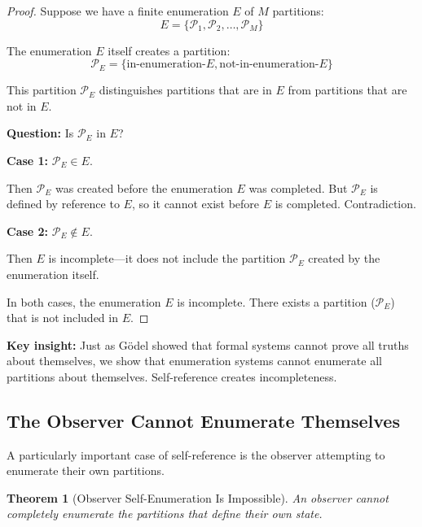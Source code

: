 \documentclass[twocolumn,10pt]{article}
\newtheorem{theorem}{Theorem}[section]
\theoremstyle{definition}
\theoremstyle{remark}
\begin{document}
\begin{proof}
Suppose we have a finite enumeration $E$ of $M$ partitions:
\begin{equation}
E = \{\mathcal{P}_1, \mathcal{P}_2, \ldots, \mathcal{P}_M\}
\end{equation}

The enumeration $E$ itself creates a partition:
\begin{equation}
\mathcal{P}_E = \{\text{in-enumeration-}E, \text{not-in-enumeration-}E\}
\end{equation}

This partition $\mathcal{P}_E$ distinguishes partitions that are in $E$ from partitions that are not in $E$.

\vspace{0.2cm}
\noindent\textbf{Question:} Is $\mathcal{P}_E$ in $E$?

\vspace{0.2cm}
\noindent\textbf{Case 1:} $\mathcal{P}_E \in E$.

Then $\mathcal{P}_E$ was created before the enumeration $E$ was completed. But $\mathcal{P}_E$ is defined by reference to $E$, so it cannot exist before $E$ is completed. Contradiction.

\vspace{0.2cm}
\noindent\textbf{Case 2:} $\mathcal{P}_E \notin E$.

Then $E$ is incomplete—it does not include the partition $\mathcal{P}_E$ created by the enumeration itself.

\vspace{0.2cm}
\noindent In both cases, the enumeration $E$ is incomplete. There exists a partition ($\mathcal{P}_E$) that is not included in $E$.
\end{proof}

\noindent\textbf{Key insight:} Just as Gödel showed that formal systems cannot prove all truths about themselves, we show that enumeration systems cannot enumerate all partitions about themselves. Self-reference creates incompleteness.

\subsection{The Observer Cannot Enumerate Themselves}

A particularly important case of self-reference is the observer attempting to enumerate their own partitions.

\begin{theorem}[Observer Self-Enumeration Is Impossible]
\label{thm:observer_self_enumeration}
An observer cannot completely enumerate the partitions that define their own state.
\end{theorem}
\end{document}
